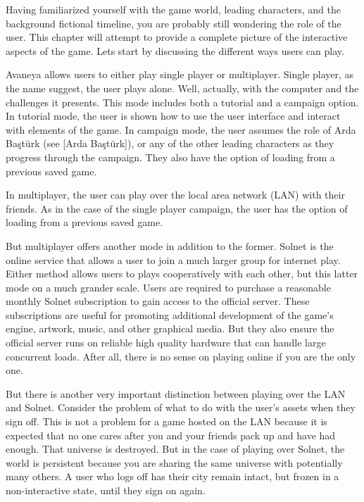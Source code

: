 
Having familiarized yourself with the game world, leading characters, and the background fictional timeline, you are probably still wondering the role of the user. This chapter will attempt to provide a complete picture of the interactive aspects of the game. Lets start by discussing the different ways users can play.

Avaneya allows users to either play single player or multiplayer. Single player, as the name suggest, the user plays alone. Well, actually, with the computer and the challenges it presents. This mode includes both a tutorial and a campaign option. In tutorial mode, the user is shown how to use the user interface and interact with elements of the game. In campaign mode, the user assumes the role of Arda Baştürk (see [Arda Baştürk]), or any of the other leading characters as they progress through the campaign. They also have the option of loading from a previous saved game.

In multiplayer, the user can play over the local area network (LAN) with their friends. As in the case of the single player campaign, the user has the option of loading from a previous saved game.

But multiplayer offers another mode in addition to the former. Solnet is the online service that allows a user to join a much larger group for internet play. Either method allows users to plays cooperatively with each other, but this latter mode on a much grander scale. Users are required to purchase a reasonable monthly Solnet subscription to gain access to the official server. These subscriptions are useful for promoting additional development of the game's engine, artwork, music, and other graphical media. But they also ensure the official server runs on reliable high quality hardware that can handle large concurrent loads. After all, there is no sense on playing online if you are the only one.

But there is another very important distinction between playing over the LAN and Solnet. Consider the problem of what to do with the user's assets when they sign off. This is not a problem for a game hosted on the LAN because it is expected that no one cares after you and your friends pack up and have had enough. That universe is destroyed. But in the case of playing over Solnet, the world is persistent because you are sharing the same universe with potentially many others. A user who logs off has their city remain intact, but frozen in a non-interactive state, until they sign on again.

%

\StopChapter

